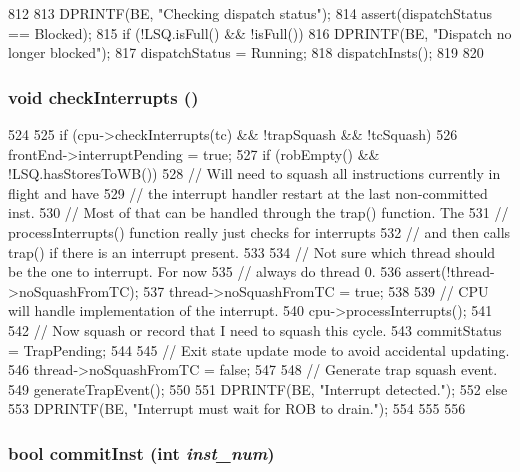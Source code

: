 \begin{DoxyCode}
812 {
813     DPRINTF(BE, "Checking dispatch status\n");
814     assert(dispatchStatus == Blocked);
815     if (!LSQ.isFull() && !isFull()) {
816         DPRINTF(BE, "Dispatch no longer blocked\n");
817         dispatchStatus = Running;
818         dispatchInsts();
819     }
820 }
\end{DoxyCode}
\hypertarget{classLWBackEnd_a53f309de2e633a8788fc67ba03d23675}{
\subsubsection[{checkInterrupts}]{\setlength{\rightskip}{0pt plus 5cm}void checkInterrupts ()}}
\label{classLWBackEnd_a53f309de2e633a8788fc67ba03d23675}



\begin{DoxyCode}
524 {
525     if (cpu->checkInterrupts(tc) && !trapSquash && !tcSquash) {
526         frontEnd->interruptPending = true;
527         if (robEmpty() && !LSQ.hasStoresToWB()) {
528             // Will need to squash all instructions currently in flight and have
529             // the interrupt handler restart at the last non-committed inst.
530             // Most of that can be handled through the trap() function.  The
531             // processInterrupts() function really just checks for interrupts
532             // and then calls trap() if there is an interrupt present.
533 
534             // Not sure which thread should be the one to interrupt.  For now
535             // always do thread 0.
536             assert(!thread->noSquashFromTC);
537             thread->noSquashFromTC = true;
538 
539             // CPU will handle implementation of the interrupt.
540             cpu->processInterrupts();
541 
542             // Now squash or record that I need to squash this cycle.
543             commitStatus = TrapPending;
544 
545             // Exit state update mode to avoid accidental updating.
546             thread->noSquashFromTC = false;
547 
548             // Generate trap squash event.
549             generateTrapEvent();
550 
551             DPRINTF(BE, "Interrupt detected.\n");
552         } else {
553             DPRINTF(BE, "Interrupt must wait for ROB to drain.\n");
554         }
555     }
556 }
\end{DoxyCode}
\hypertarget{classLWBackEnd_a300f33ed45badc3c856983b1b7469955}{
\subsubsection[{commitInst}]{\setlength{\rightskip}{0pt plus 5cm}bool commitInst (int {\em inst\_\-num})}}
\label{classLWBackEnd_a300f33ed45badc3c856983b1b7469955}



